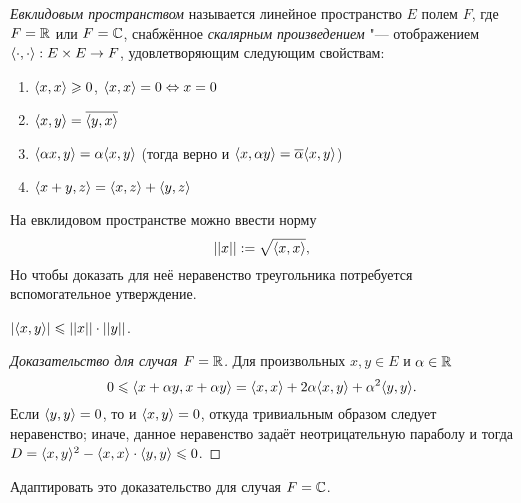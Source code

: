 \documentclass[main]{subfiles}
\begin{document}

\begin{definition}
  \emph{Евклидовым пространством} называется
  линейное пространство \( E \) полем \( F \),
  где \( F = \mathbb{R} \) или \( F = \mathbb{C} \),
  снабжённое \emph{скалярным произведением} "---
  отображением \( \langle \cdot, \cdot \rangle : E \times E \to F \),
  удовлетворяющим следующим свойствам:
  \begin{enumerate}
    \item \( \langle x, x \rangle \geqslant 0 \), \( \langle x, x \rangle = 0 \Leftrightarrow x = 0 \)
    \item \( \langle x, y \rangle = \overline{\langle y, x \rangle} \)
    \item \( \langle \alpha x, y \rangle = \alpha \langle x, y \rangle \)
      (тогда верно и \( \langle x, \alpha y \rangle = \overline{\alpha} \langle x, y \rangle \))
    \item \( \langle x + y, z \rangle = \langle x, z \rangle + \langle y, z \rangle \)
  \end{enumerate}
\end{definition}

На евклидовом пространстве можно ввести норму
\[ ||x|| := \sqrt{\langle x, x \rangle}, \]
Но чтобы доказать для неё неравенство треугольника
потребуется вспомогательное утверждение.

\begin{lemma}
  \( |\langle x, y \rangle| \leqslant ||x|| \cdot ||y|| \).
\end{lemma}
\begin{proof}[Доказательство для случая \( F = \mathbb{R} \)]
  Для произвольных \( x, y \in E \) и \( \alpha \in \mathbb{R} \)
  \[ 0 \leqslant \langle x + \alpha y, x + \alpha y \rangle =
  \langle x, x \rangle + 2 \alpha \langle x, y \rangle + \alpha^2 \langle y, y \rangle. \]
  Если \( \langle y, y \rangle = 0 \), то и \( \langle x, y \rangle = 0 \),
  откуда тривиальным образом следует неравенство; иначе, данное неравенство
  задаёт неотрицательную параболу и тогда
  \( D = \langle x, y \rangle^2 - \langle x, x \rangle \cdot \langle y, y \rangle \leqslant 0 \).
\end{proof}

\begin{exercise}
  Адаптировать это доказательство для случая \( F = \mathbb{C} \).
\end{exercise}
\end{document}
